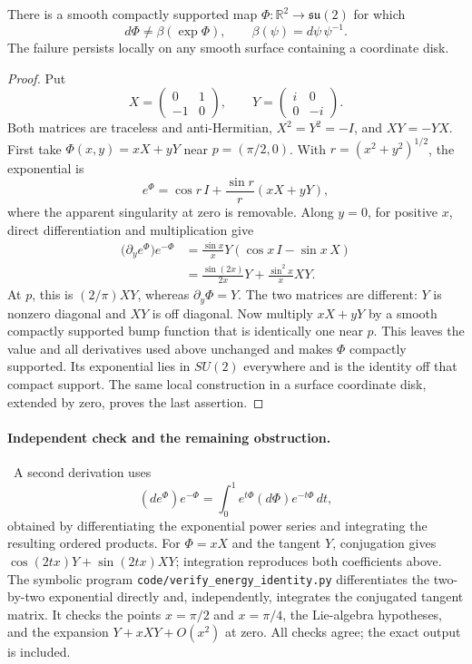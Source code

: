 \begin{example}
There is a smooth compactly supported map \(\Phi:\mathbb R^2\to\mathfrak{su}(2)\) for which
\[
 d\Phi\ne\beta(\exp\Phi),\qquad
 \beta(\psi)=d\psi\,\psi^{-1}.
\]
The failure persists locally on any smooth surface containing a coordinate disk.
\end{example}
\begin{proof}
Put
\[
 X=\begin{pmatrix}0&1\\-1&0\end{pmatrix},\qquad
 Y=\begin{pmatrix}i&0\\0&-i\end{pmatrix}.
\]
Both matrices are traceless and anti-Hermitian, \(X^2=Y^2=-I\), and \(XY=-YX\). First take \(\Phi(x,y)=xX+yY\) near \(p=(\pi/2,0)\). With \(r=(x^2+y^2)^{1/2}\), the exponential is
\[
 e^{\Phi}=\cos r\,I+\frac{\sin r}{r}(xX+yY),
\]
where the apparent singularity at zero is removable. Along \(y=0\), for positive \(x\), direct differentiation and multiplication give
\begin{align*}
 \bigl(\partial_y e^{\Phi}\bigr)e^{-\Phi}
 &=\frac{\sin x}{x}Y(\cos x\,I-\sin x\,X)\\
 &=\frac{\sin(2x)}{2x}Y+\frac{\sin^2x}{x}XY.
\end{align*}
At \(p\), this is \((2/\pi)XY\), whereas \(\partial_y\Phi=Y\). The two matrices are different: \(Y\) is nonzero diagonal and \(XY\) is off diagonal. Now multiply \(xX+yY\) by a smooth compactly supported bump function that is identically one near \(p\). This leaves the value and all derivatives used above unchanged and makes \(\Phi\) compactly supported. Its exponential lies in \(SU(2)\) everywhere and is the identity off that compact support. The same local construction in a surface coordinate disk, extended by zero, proves the last assertion.
\end{proof}

\paragraph{Independent check and the remaining obstruction.}
\oursComputed\ A second derivation uses
\[
 (d e^{\Phi})e^{-\Phi}
 =\int_0^1 e^{t\Phi}(d\Phi)e^{-t\Phi}\,dt,
\]
obtained by differentiating the exponential power series and integrating the resulting ordered products. For \(\Phi=xX\) and the tangent \(Y\), conjugation gives \(\cos(2tx)Y+\sin(2tx)XY\); integration reproduces both coefficients above. The symbolic program \texttt{code/verify\_energy\_identity.py} differentiates the two-by-two exponential directly and, independently, integrates the conjugated tangent matrix. It checks the points \(x=\pi/2\) and \(x=\pi/4\), the Lie-algebra hypotheses, and the expansion \(Y+xXY+O(x^2)\) at zero. All checks agree; the exact output is included.

